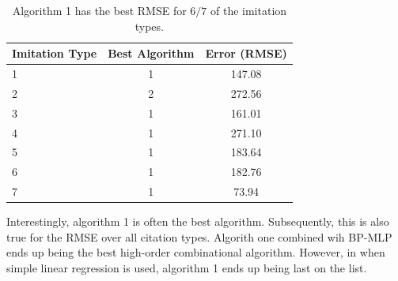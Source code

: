 \begin{table}[center]
	\centering
	\begin{center}
		\begin{tabular}{|l|c|c|} \hline
			\textbf{Imitation Type}	& \textbf{Best Algorithm}	&	\textbf{Error (RMSE)}	\\ \hline \hline
			1						& 1							&	147.08					\\ \hline
			2						& 2							&	272.56					\\ \hline
			3						& 1							&	161.01					\\ \hline
			4						& 1							&	271.10					\\ \hline
			5						& 1							&	183.64					\\ \hline
			6						& 1							&	182.76					\\ \hline
			7						& 1							&	73.94					\\ \hline
		\end{tabular}
	\end{center}
	\caption{Algorithm 1 has the best RMSE for $6/7$ of the imitation types.}
	\label{tab:best-for-each}
\end{table}

Interestingly, algorithm 1 is often the best algorithm. Subsequently, this is also true for the RMSE over all citation types. Algorith one combined wih BP-MLP ends up being the best high-order combinational algorithm. However, in when simple linear regression is used, algorithm 1 ends up being last on the list.


